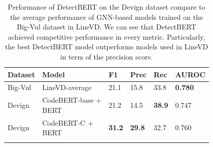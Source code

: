 \documentclass{ieeeaccess}
\begin{document}
\begin{table}[h]
\centering
\begin{tabular}{llllll}
\Xhline{2\arrayrulewidth}
\textbf{Dataset}&\textbf{Model} & \textbf{F1} & \textbf{Prec}&  \textbf{Rec}&  \textbf{AUROC}\\
\hline
\rowcolor{gray!15} 
Big-Vul&LineVD-average &21.1 & 15.8  & 33.8 & \textbf{0.780}\\
Devign&\makecell[align=left]{CodeBERT-base\cite{codebert} + \\ BERT} & 21.2 & 14.5 & \textbf{38.9} & 0.747\\
\rowcolor{gray!15} 
Devign&\makecell[align=left]{CodeBERT-C\cite{zhou2023codeBERTscore} +\\ BERT} &  \textbf{31.2} & \textbf{29.8} & 32.7 & 0.760\\
\Xhline{2\arrayrulewidth}
\end{tabular}

\caption{Performance of DetectBERT on the Devign dataset compare to the average performance of GNN-based models trained on the Big-Vul dataset in LineVD\cite{Linevd}.  We can see  that DetectBERT achieved competitive performance in every metric.  Particularly, the best DetectBERT model outperforms models used in LineVD in term of the precision score. }
\label{table:RQ5_exp_res}
\end{table}
\end{document}
